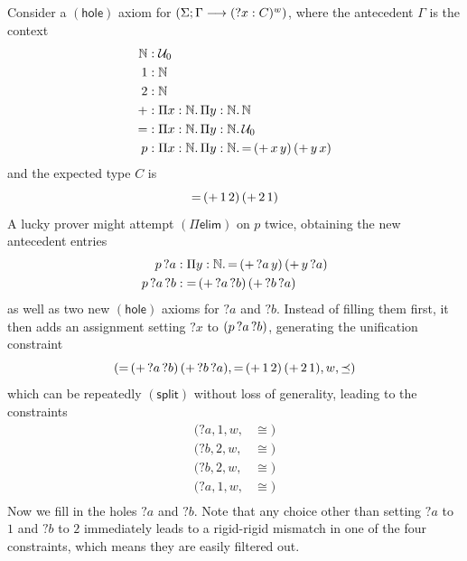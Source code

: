 \documentclass[twoside]{report}
\begin{document}
\begin{example}
    Consider a $(\mathsf{hole})$ axiom for $(\Sigma; \Gamma \longrightarrow ({?x} : C)^w)$, where the antecedent $\Gamma$ is the context
    $$
        \begin{aligned}
            \mathbb N & : \mathcal U_0                                                                                        \\
            1         & : \mathbb N                                                                                           \\
            2         & : \mathbb N                                                                                           \\
            +         & : \Pi{x} : {\mathbb N}.\,{\Pi{y} : {\mathbb N}.\,{\mathbb N}}                                                 \\
            =         & : \Pi{x} : {\mathbb N}.\,{\Pi{y} : {\mathbb N}.\,{\mathcal U_0}}                                              \\
            p         & : \Pi{x} : {\mathbb N}.\,{\Pi{y} : {\mathbb N}.\,{{{=}\,{({{+}\,{x}}\,{y})}}\,{({{+}\,{y}}\,{x})}}}
        \end{aligned}
    $$
    and the expected type $C$ is
    $$
        {{=}\,{({{+}\,{1}}\,{2})}}\,{({{+}\,{2}}\,{1})}
    $$
    A lucky prover might attempt $(\Pi\mathsf{elim})$ on $p$ twice, obtaining the new antecedent entries
    $$
        \begin{aligned}
            {p}\,{?a}             & : \Pi{y} : {\mathbb N}.\,{{{=}\,{({{+}\,{?a}}\,{y})}}\,{({{+}\,{y}}\,{?a})}} \\
            {{p}\,{?a}}\,{?b} & : {{=}\,{({{+}\,{?a}}\,{?b})}}\,{({{+}\,{?b}}\,{?a})}                \\
        \end{aligned}
    $$
    as well as two new $(\mathsf{hole})$ axioms for ${?a}$ and ${?b}$. Instead of filling them first, it then adds an assignment setting ${?x}$ to $({{p}\,{?a}}\,{?b})$, generating the unification constraint
    $$
        ({{=}\,{({{+}\,{?a}}\,{?b})}}\,{({{+}\,{?b}}\,{?a})}, {{=}\,{({{+}\,{1}}\,{2})}}\,{({{+}\,{2}}\,{1})}, w, \preceq)
    $$
    which can be repeatedly $(\mathsf{split})$ without loss of generality, leading to the constraints
    $$
        \begin{aligned}
            ({?a}, 1, w, & \cong) \\
            ({?b}, 2, w, & \cong) \\
            ({?b}, 2, w, & \cong) \\
            ({?a}, 1, w, & \cong) \\
        \end{aligned}
    $$
    Now we fill in the holes ${?a}$ and ${?b}$. Note that any choice other than setting ${?a}$ to $1$ and ${?b}$ to $2$ immediately leads to a rigid-rigid mismatch in one of the four constraints, which means they are easily filtered out.


\end{example}
\end{document}
